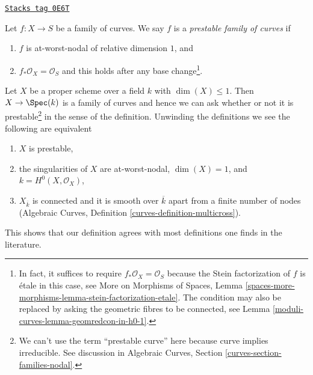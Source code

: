 \begin{definition}[Prestable]
\label{moduli-curves-definition-prestable}
\href{https://stacks.math.columbia.edu/tag/0E6T}{\texttt{Stacks tag 0E6T}}

Let $f : X \to S$ be a family of curves. We say $f$ is a
{\it prestable family of curves} if
\begin{enumerate}
\item $f$ is at-worst-nodal of relative dimension $1$, and
\item $f_*\mathcal{O}_X = \mathcal{O}_S$ and this holds after
any base change\footnote{In fact, it suffices to require
$f_*\mathcal{O}_X = \mathcal{O}_S$ because the Stein factorization
of $f$ is \'etale in this case, see
More on Morphisms of Spaces, Lemma
\ref{spaces-more-morphisms-lemma-stein-factorization-etale}.
The condition may also be replaced by asking the geometric
fibres to be connected, see Lemma \ref{moduli-curves-lemma-geomredcon-in-h0-1}.}.
\end{enumerate}
\end{definition}

Let $X$ be a proper scheme over a field $k$ with $\dim(X) \leq 1$.
Then $X \to \Spec(k)$ is a family of curves and hence we can ask
whether or not it is prestable\footnote{We can't use the term
``prestable curve'' here because curve implies irreducible. See
discussion in Algebraic Curves, Section \ref{curves-section-families-nodal}.}
in the sense of the definition. Unwinding the definitions we see
the following are equivalent
\begin{enumerate}
\item $X$ is prestable,
\item the singularities of $X$ are at-worst-nodal, $\dim(X) = 1$,
and $k = H^0(X, \mathcal{O}_X)$,
\item $X_{\overline{k}}$ is connected and it is smooth over $\overline{k}$
apart from a finite number of nodes
(Algebraic Curves, Definition \ref{curves-definition-multicross}).
\end{enumerate}
This shows that our definition agrees with most definitions one finds
in the literature.

